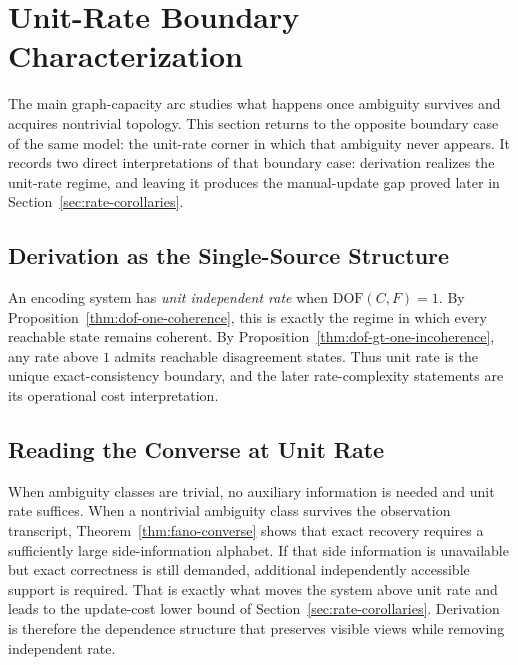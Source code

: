 \section{Unit-Rate Boundary Characterization}\label{sec:ssot}

The main graph-capacity arc studies what happens once ambiguity survives and acquires nontrivial topology. This section returns to the opposite boundary case of the same model: the unit-rate corner in which that ambiguity never appears. It records two direct interpretations of that boundary case: derivation realizes the unit-rate regime, and leaving it produces the manual-update gap proved later in Section~\ref{sec:rate-corollaries}.

\subsection{Derivation as the Single-Source Structure}\label{sec:ssot-def}

An encoding system has \emph{unit independent rate} when $\text{DOF}(C,F)=1$. By Proposition~\ref{thm:dof-one-coherence}, this is exactly the regime in which every reachable state remains coherent. By Proposition~\ref{thm:dof-gt-one-incoherence}, any rate above $1$ admits reachable disagreement states. Thus unit rate is the unique exact-consistency boundary, and the later rate-complexity statements are its operational cost interpretation.

\subsection{Reading the Converse at Unit Rate}\label{sec:info-sketches}

When ambiguity classes are trivial, no auxiliary information is needed and unit rate suffices. When a nontrivial ambiguity class survives the observation transcript, Theorem~\ref{thm:fano-converse} shows that exact recovery requires a sufficiently large side-information alphabet. If that side information is unavailable but exact correctness is still demanded, additional independently accessible support is required. That is exactly what moves the system above unit rate and leads to the update-cost lower bound of Section~\ref{sec:rate-corollaries}. Derivation is therefore the dependence structure that preserves visible views while removing independent rate.

